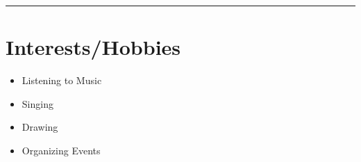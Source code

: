 \documentclass[a4paper,10pt]{article}
\begin{document}
\vspace{1em}
\noindent\rule{16cm}{0.4pt}

\section*{Interests/Hobbies} 
\begin{itemize}[left=0pt, label=\textbullet, labelsep=1em]
    \item Listening to Music
    \item Singing
    \item Drawing
    \item Organizing Events
\end{itemize}
\end{document}
